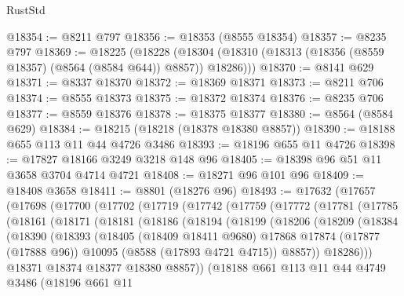 \begin{lexlean}{RustStd}
\begin{coremodule}
@18354 := @8211 @797
@18356 := @18353 (@8555 @18354)
@18357 := @8235 @797
@18369 := @18225
    (@18228 (@18304 (@18310 (@18313 (@18356 (@8559 @18357) (@8564 (@8584 @644)) @8857)) @18286)))
@18370 := @8141 @629
@18371 := @8337 @18370
@18372 := @18369 @18371
@18373 := @8211 @706
@18374 := @8555 @18373
@18375 := @18372 @18374
@18376 := @8235 @706
@18377 := @8559 @18376
@18378 := @18375 @18377
@18380 := @8564 (@8584 @629)
@18384 := @18215 (@18218 (@18378 @18380 @8857))
@18390 := @18188 @655 @113 @11 @44 @4726 @3486
@18393 := @18196 @655 @11 @4726
@18398 := @17827 @18166 @3249 @3218 @148 @96
@18405 := @18398 @96 @51 @11 @3658 @3704 @4714 @4721
@18408 := @18271 @96 @101 @96
@18409 := @18408 @3658
@18411 := @8801 (@18276 @96)
@18493 := @17632
    (@17657
      (@17698
        (@17700
          (@17702
            (@17719
              (@17742
                (@17759
                  (@17772
                    (@17781
                      (@17785
                        (@18161
                          (@18171
                            (@18181
                              (@18186
                                (@18194
                                  (@18199
                                    (@18206
                                      (@18209
                                        (@18384
                                          (@18390
                                            (@18393
                                              (@18405
                                                (@18409 @18411 @9680)
                                                @17868
                                                @17874
                                                (@17877 (@17888 @96))
                                                @10095
                                                (@8588 (@17893 @4721 @4715))
                                                @8857))
                                            @18286)))
                                      @18371
                                      @18374
                                      @18377
                                      @18380
                                      @8857))
                                  (@18188
                                    @661
                                    @113
                                    @11
                                    @44
                                    @4749
                                    @3486
                                    (@18196
                                      @661
                                      @11

\end{coremodule}
\end{lexlean}
